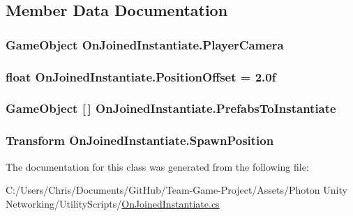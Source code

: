 \subsection{Member Data Documentation}
\subsubsection[{\texorpdfstring{Player\+Camera}{PlayerCamera}}]{\setlength{\rightskip}{0pt plus 5cm}Game\+Object On\+Joined\+Instantiate.\+Player\+Camera}\hypertarget{class_on_joined_instantiate_a2b51d7c4fe95905cabe75bc8b8cb774c}{}\label{class_on_joined_instantiate_a2b51d7c4fe95905cabe75bc8b8cb774c}
\subsubsection[{\texorpdfstring{Position\+Offset}{PositionOffset}}]{\setlength{\rightskip}{0pt plus 5cm}float On\+Joined\+Instantiate.\+Position\+Offset = 2.\+0f}\hypertarget{class_on_joined_instantiate_a5c87d1af9e4da3d06e67879299492743}{}\label{class_on_joined_instantiate_a5c87d1af9e4da3d06e67879299492743}
\subsubsection[{\texorpdfstring{Prefabs\+To\+Instantiate}{PrefabsToInstantiate}}]{\setlength{\rightskip}{0pt plus 5cm}Game\+Object \mbox{[}$\,$\mbox{]} On\+Joined\+Instantiate.\+Prefabs\+To\+Instantiate}\hypertarget{class_on_joined_instantiate_a2a93970211d73e8110535c65f10e4631}{}\label{class_on_joined_instantiate_a2a93970211d73e8110535c65f10e4631}
\subsubsection[{\texorpdfstring{Spawn\+Position}{SpawnPosition}}]{\setlength{\rightskip}{0pt plus 5cm}Transform On\+Joined\+Instantiate.\+Spawn\+Position}\hypertarget{class_on_joined_instantiate_aa263e65b49298aaf137c2de1bf8e2414}{}\label{class_on_joined_instantiate_aa263e65b49298aaf137c2de1bf8e2414}


The documentation for this class was generated from the following file\+:\begin{DoxyCompactItemize}
\item 
C\+:/\+Users/\+Chris/\+Documents/\+Git\+Hub/\+Team-\/\+Game-\/\+Project/\+Assets/\+Photon Unity Networking/\+Utility\+Scripts/\hyperlink{_on_joined_instantiate_8cs}{On\+Joined\+Instantiate.\+cs}\end{DoxyCompactItemize}
